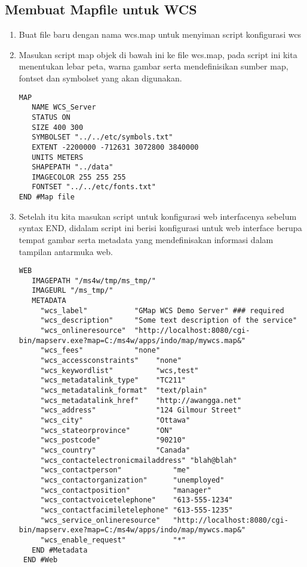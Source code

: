 \subsection{Membuat Mapfile untuk WCS}
\begin{enumerate}
\item Buat file baru dengan nama wcs.map untuk menyiman script konfigurasi wcs
\item Masukan script map objek di bawah ini ke file wcs.map, pada script ini kita menentukan lebar peta, warna gambar serta mendefinisikan sumber map, fontset dan symbolset yang akan digunakan. 
\begin{lstlisting}
MAP
   NAME WCS_Server
   STATUS ON
   SIZE 400 300
   SYMBOLSET "../../etc/symbols.txt"
   EXTENT -2200000 -712631 3072800 3840000
   UNITS METERS
   SHAPEPATH "../data"
   IMAGECOLOR 255 255 255
   FONTSET "../../etc/fonts.txt"
END #Map file
\end{lstlisting}
\item Setelah itu kita masukan script untuk konfigurasi web interfacenya sebelum syntax END, didalam script ini berisi konfigurasi untuk web interface berupa tempat gambar serta metadata yang mendefinisakan informasi dalam tampilan antarmuka web.
\begin{lstlisting}
WEB
   IMAGEPATH "/ms4w/tmp/ms_tmp/"
   IMAGEURL "/ms_tmp/"
   METADATA
     "wcs_label"           "GMap WCS Demo Server" ### required
     "wcs_description"     "Some text description of the service"
     "wcs_onlineresource"  "http://localhost:8080/cgi-bin/mapserv.exe?map=C:/ms4w/apps/indo/map/mywcs.map&" 
     "wcs_fees"            "none"
     "wcs_accessconstraints"    "none"
     "wcs_keywordlist"          "wcs,test"
     "wcs_metadatalink_type"    "TC211"
     "wcs_metadatalink_format"  "text/plain"
     "wcs_metadatalink_href"    "http://awangga.net"
     "wcs_address"              "124 Gilmour Street"
     "wcs_city"                 "Ottawa"
     "wcs_stateorprovince"      "ON"
     "wcs_postcode"             "90210"
     "wcs_country"              "Canada"
     "wcs_contactelectronicmailaddress" "blah@blah"
     "wcs_contactperson"            "me"
     "wcs_contactorganization"      "unemployed"
     "wcs_contactposition"          "manager"
     "wcs_contactvoicetelephone"    "613-555-1234"
     "wcs_contactfacimiletelephone" "613-555-1235"
     "wcs_service_onlineresource"   "http://localhost:8080/cgi-bin/mapserv.exe?map=C:/ms4w/apps/indo/map/mywcs.map&"
     "wcs_enable_request"           "*"
   END #Metadata
 END #Web
\end{lstlisting}


\end{enumerate}
